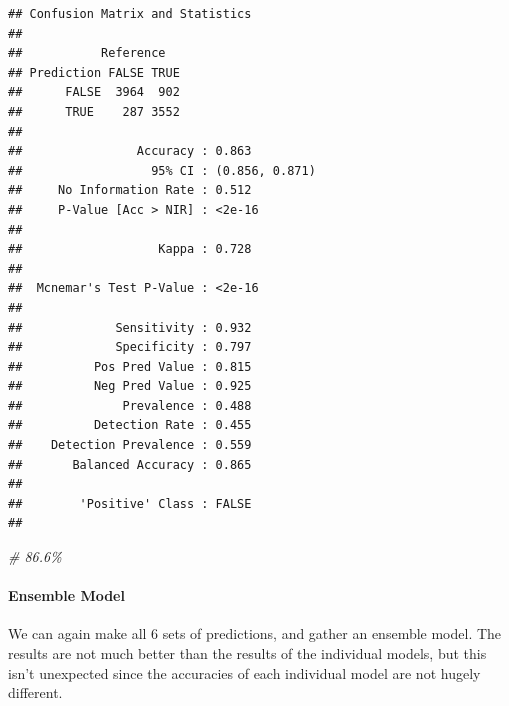\documentclass[
]{article}
\newenvironment{Shaded}{\begin{snugshade}}{\end{snugshade}}
\newcommand{\CommentTok}[1]{\textcolor[rgb]{0.56,0.35,0.01}{\textit{#1}}}
\newcommand{\FunctionTok}[1]{\textcolor[rgb]{0.00,0.00,0.00}{#1}}
\newcommand{\NormalTok}[1]{#1}
\newcommand{\SpecialCharTok}[1]{\textcolor[rgb]{0.00,0.00,0.00}{#1}}
\begin{document}
\begin{Shaded}
\end{Shaded}

\begin{verbatim}
## Confusion Matrix and Statistics
## 
##           Reference
## Prediction FALSE TRUE
##      FALSE  3964  902
##      TRUE    287 3552
##                                         
##                Accuracy : 0.863         
##                  95% CI : (0.856, 0.871)
##     No Information Rate : 0.512         
##     P-Value [Acc > NIR] : <2e-16        
##                                         
##                   Kappa : 0.728         
##                                         
##  Mcnemar's Test P-Value : <2e-16        
##                                         
##             Sensitivity : 0.932         
##             Specificity : 0.797         
##          Pos Pred Value : 0.815         
##          Neg Pred Value : 0.925         
##              Prevalence : 0.488         
##          Detection Rate : 0.455         
##    Detection Prevalence : 0.559         
##       Balanced Accuracy : 0.865         
##                                         
##        'Positive' Class : FALSE         
## 
\end{verbatim}

\begin{Shaded}
\begin{Highlighting}[]
\CommentTok{\# 86.6\%}
\end{Highlighting}
\end{Shaded}

\hypertarget{ensemble-model-1}{%
\paragraph{Ensemble Model}\label{ensemble-model-1}}

We can again make all 6 sets of predictions, and gather an ensemble
model. The results are not much better than the results of the
individual models, but this isn't unexpected since the accuracies of
each individual model are not hugely different.
\end{document}
